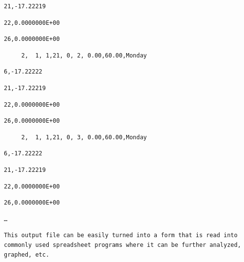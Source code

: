 \begin{lstlisting}
21,-17.22219
\end{lstlisting}

\begin{lstlisting}
22,0.0000000E+00
\end{lstlisting}

\begin{lstlisting}
26,0.0000000E+00
\end{lstlisting}

\begin{lstlisting}
     2,  1, 1,21, 0, 2, 0.00,60.00,Monday
\end{lstlisting}

\begin{lstlisting}
6,-17.22222
\end{lstlisting}

\begin{lstlisting}
21,-17.22219
\end{lstlisting}

\begin{lstlisting}
22,0.0000000E+00
\end{lstlisting}

\begin{lstlisting}
26,0.0000000E+00
\end{lstlisting}

\begin{lstlisting}
     2,  1, 1,21, 0, 3, 0.00,60.00,Monday
\end{lstlisting}

\begin{lstlisting}
6,-17.22222
\end{lstlisting}

\begin{lstlisting}
21,-17.22219
\end{lstlisting}

\begin{lstlisting}
22,0.0000000E+00
\end{lstlisting}

\begin{lstlisting}
26,0.0000000E+00
\end{lstlisting}

\begin{lstlisting}
…
\end{lstlisting}

\begin{lstlisting}
This output file can be easily turned into a form that is read into commonly used spreadsheet programs where it can be further analyzed, graphed, etc.
\end{lstlisting}

